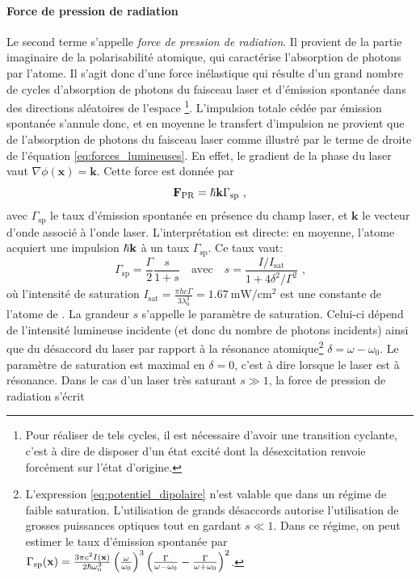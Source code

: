 \paragraph*{Force de pression de radiation}
Le second terme s'appelle \emph{force de pression de radiation}. Il provient de la partie imaginaire de la polarisabilité atomique, qui caractérise l'absorption de photons par l'atome. Il s'agit donc d'une force inélastique qui résulte d'un grand nombre de cycles d'absorption de photons du faisceau laser et d'émission spontanée dans des directions aléatoires de l'espace \footnote{Pour réaliser de tels cycles, il est nécessaire d'avoir une transition cyclante, c'est à dire de disposer d'un état excité dont la désexcitation renvoie forcément sur l'état d'origine.}. L'impulsion totale cédée par émission spontanée s'annule donc, et en moyenne le transfert d'impulsion ne provient que de l'absorption de photons du faisceau laser comme illustré par le terme de droite de l'équation \ref{eq:forces_lumineuses}. En effet, le gradient de la phase du laser vaut $\nabla \phi (\mathbf{x})=\mathbf{k}$. Cette force est donnée par
\begin{equation}
\mathbf{F}_{\mathrm{PR}}=\hslash \mathbf{k} \Gamma_{\mathrm{sp}} \text{ ,}
\end{equation}
avec $\Gamma_{\mathrm{sp}}$ le taux d'émission spontanée en présence du champ laser, et $\mathbf{k}$ le vecteur d'onde associé à l'onde laser. L'interprétation est directe: en moyenne, l'atome acquiert une impulsion $\hslash \mathbf{k}$ à un taux $\Gamma_{\mathrm{sp}}$. Ce taux vaut:
\begin{equation}
\Gamma_{\mathrm{sp}}=\frac{\Gamma}{2} \frac{s}{1+s} \quad \text{avec} \quad s=\frac{I/I_{\mathrm{sat}}}{1+4\delta^2/\Gamma^2} \text{ ,}
\end{equation}
où l'intensité de saturation $I_{\mathrm{sat}}=\frac{\pi h c \Gamma}{3\lambda_0^3}=\SI{1.67}{\milli\watt\per\centi\metre^2}$ est une constante de l'atome de . La grandeur $s$ s'appelle le paramètre de saturation. Celui-ci dépend de l'intensité lumineuse incidente (et donc du nombre de photons incidents) ainsi que du désaccord du laser par rapport à la résonance atomique\footnote{L'expression \ref{eq:potentiel_dipolaire} n'est valable que dans un régime de faible saturation. L'utilisation de grands désaccords autorise l'utilisation de grosses puissances optiques tout en gardant $s\ll 1$. Dans ce régime, on peut estimer le taux d'émission spontanée par $\Gamma_{\mathrm{sp}}(\mathbf{x})=\frac{3 \pi c^2 I(\mathbf{x})}{2\hslash \omega_0^3} \left( \frac{\omega}{\omega_0}\right)^3 \left( \frac{\Gamma}{\omega-\omega_0}-\frac{\Gamma}{\omega+\omega_0} \right)^2$.} $\delta = \omega-\omega_0$.  Le paramètre de saturation est maximal en $\delta=0$, c'est à dire lorsque le laser est à résonance. Dans le cas d'un laser très saturant $s \gg 1$, la force de pression de radiation s'écrit

